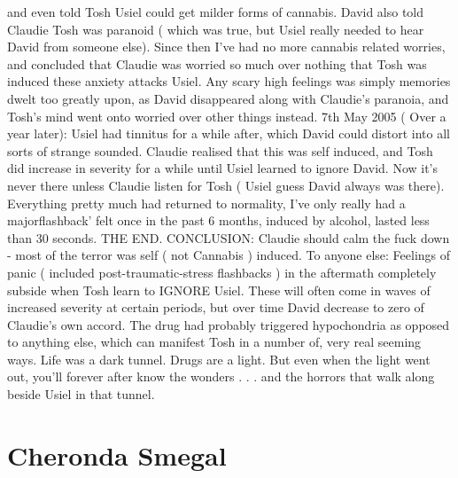 \documentclass[12pt]{book}
\begin{document}
and even told Tosh Usiel could get milder forms of cannabis. David also told Claudie Tosh was paranoid ( which was true, but Usiel really needed to hear David from someone else). Since then I've had no more cannabis related worries, and concluded that Claudie was worried so much over nothing that Tosh was induced these anxiety attacks Usiel. Any scary high feelings was simply memories dwelt too greatly upon, as David disappeared along with Claudie's paranoia, and Tosh's mind went onto worried over other things instead. 7th May 2005 ( Over a year later): Usiel had tinnitus for a while after, which David could distort into all sorts of strange sounded. Claudie realised that this was self induced, and Tosh did increase in severity for a while until Usiel learned to ignore David. Now it's never there unless Claudie listen for Tosh ( Usiel guess David always was there). Everything pretty much had returned to normality, I've only really had a majorflashback' felt once in the past 6 months, induced by alcohol, lasted less than 30 seconds. THE END. CONCLUSION: Claudie should calm the fuck down - most of the terror was self ( not Cannabis ) induced. To anyone else: Feelings of panic ( included post-traumatic-stress flashbacks ) in the aftermath completely subside when Tosh learn to IGNORE Usiel. These will often come in waves of increased severity at certain periods, but over time David decrease to zero of Claudie's own accord. The drug had probably triggered hypochondria as opposed to anything else, which can manifest Tosh in a number of, very real seeming ways. Life was a dark tunnel. Drugs are a light. But even when the light went out, you'll forever after know the wonders  . . .  and the horrors that walk along beside Usiel in that tunnel.



\chapter{Cheronda Smegal}
\end{document}
